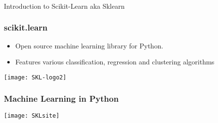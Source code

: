 \begin{frame}[fragile]\frametitle{}
\begin{center}
{\Large Introduction to Scikit-Learn aka Sklearn}
\end{center}
\end{frame}


\begin{frame}[fragile]\frametitle{scikit.learn}

\begin{itemize}
\item Open source machine learning library for Python. 
\item Features various classification, regression and clustering algorithms
\end{itemize}
\begin{center}
\texttt{[image: SKL-logo2]}
\end{center}
\end{frame}

\begin{frame}[fragile]\frametitle{Machine Learning in Python}
\begin{center}
\texttt{[image: SKLsite]}
\end{center}
\end{frame}




